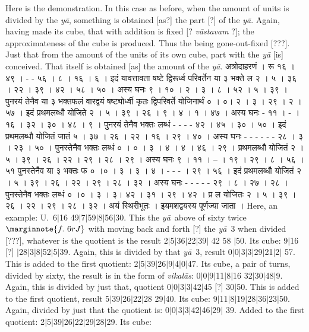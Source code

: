 \documentclass[11pt,a5paper]{book}
\def\ya{\textit{y\=a}}
\def\vikalas{\textit{vi\-ka\-l\=as}}
\def\danda{$|$}
\begin{document}
Here is the demonstration. In this case as before, when the amount of units is divided by the \ya, 
something is obtained [as?] the part [?] of the \ya. Again, having made its cube, that with addition
is fixed [? \textit{v\=astava\*m} ?]; the approximateness of the cube is produced. Thus the being
gone-out-fixed [???].  Just that from the amount of the units of its own cube, part with the \ya 
[is] conceived. That itself is obtained [as] the amount of the \ya. 
\newpage
{\s अत्रोदाहरणं । रू १६ । ४९ । - - ५६ । ८ । १६ । ६ । 
इदं यावत्तावता षष्टे द्विरूर्ध्व परिवर्तेन या ३ भक्ते ल २ । ५ । ३६ । २२ । ३९ । ४२ । ५८ । ५० । 
अस्य घनः ९ । १० । २ । ३ । ८ । ५२ । ५ । ३९ । 
पुनरयं तेनैव या ३ भक्तफलं वारद्वयं षष्ट्योर्ध्वी कृतः द्विपरिवर्ते योजिनार्थं ० । ०। २ । ३ । २९ । २ । ५७ । 
इदं प्रथमलब्धौ योजिते २ । ५ । ३९ । २६ ।  ९ । ४ । १ । ४७ । 
अस्य घनः - ११ । - । १६ । ३२ । ३० । ४८ । ९ । 
पुनरयं तेनैव भक्तः लब्धं - - - - ४२ । ४५ । ३० । ५० । 
इदं प्रथमलब्धौ योजितं जातं ५ । ३७ । २६ । २२ । १६ । २९ । ४० । 
अस्य घनः - - - - - - २८ । ३ । २३ । ५० । पुनस्तेनैव भक्तः लब्धं ० । ० । ३ । ४ । ४ । ४६ । २९ । 
प्रथमलब्धौ योजितं २ । ५ । ३९ । २६ । २२ । २९ । २८ । २९ । 
अस्य घनः ९ । ११ । -- । १९ । २९ । ८ । ५६ । ५१ पुनस्तेनैव या ३ भक्तः फ ० ।० । ३ । ३ । ४ । - - - । २९ । ५६ । 
इदं प्रथमलब्धौ योजितं २ । ५ । ३९ । २६ । २२ । २९ । २८ । ३२ । 
अस्य घनः - - - - - २९ । ८ । २७ । २८ । 
पुनस्तेनैव भक्तः लब्धं ० ।० । ३ । ३। ४२ । ३१ । २९ । ४२ । प्र ल योजितः २ । ५ । ३९ । २६ । २२ । २९ । २८ । ३२ । 
अयं स्थिरीभूतः । इयमशद्वयस्य पूर्णज्या जाता ।} 
\newpage
Here, an example: U.\ 6\danda 16  49\danda 7\danda 59\danda 8\danda 56\danda 30. 
This the \ya\ above of sixty twice
$\marginnote{f.~6r J} $
with moving back and forth [?] the \ya\ 3 when divided [???],
whatever is the quotient is the result 2\danda 5\danda 36\danda 22\danda 39\danda
42 58 \danda 50. Its cube: 9\danda 16 [?] \danda 28\danda 3\danda 8\danda 52\danda 5\danda 39.
Again, this is divided by that \ya\ 3, result 0\danda 0\danda 3\danda 3\danda 29\danda 21\danda 2\danda 
57. This is added to the first quotient: 2\danda 5\danda 39\danda 26\danda 9\danda 4\danda 0\danda 47.
Its cube, a pair of turns, divided by sixty, the result is in the form of \vikalas: 
0\danda 0\danda 9\danda 11\danda 8\danda 16 32\danda 30\danda 48\danda 9.
Again, this is divided by just that, quotient 0\danda 0\danda 3\danda 3\danda 42\danda 45 [?]
30\danda 50. This is added to the first quotient, result 5\danda 39\danda 26\danda 22\danda 28
29\danda 40. Its cube: 9\danda 11\danda 8\danda 19\danda 28\danda 36\danda 23\danda 50.
Again, divided by just that the quotient is: 0\danda 0\danda 3\danda 3\danda 42\danda 46\danda 29\danda
39. Added to the first quotient: 2\danda 5\danda 39\danda 26\danda 22\danda 29\danda 28\danda 29. 
Its cube: 
\end{document}
